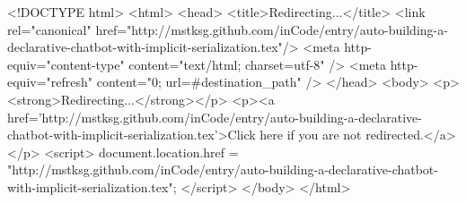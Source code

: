 <!DOCTYPE html>
<html>
<head>
<title>Redirecting...</title>
<link rel="canonical" href="http://mstksg.github.com/inCode/entry/auto-building-a-declarative-chatbot-with-implicit-serialization.tex"/>
<meta http-equiv="content-type" content="text/html; charset=utf-8" />
<meta http-equiv="refresh" content="0; url=#{destination_path}" />
</head>
<body>
  <p><strong>Redirecting...</strong></p>
  <p><a href='http://mstksg.github.com/inCode/entry/auto-building-a-declarative-chatbot-with-implicit-serialization.tex'>Click here if you are not redirected.</a></p>
  <script>
    document.location.href = "http://mstksg.github.com/inCode/entry/auto-building-a-declarative-chatbot-with-implicit-serialization.tex";
  </script>
</body>
</html>

